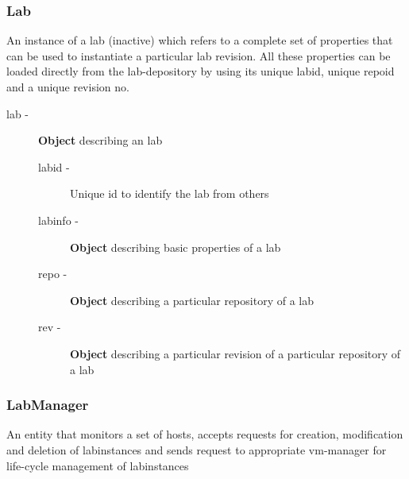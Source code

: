 \documentclass[11pt]{article}
\begin{document}
\subsubsection{Lab}
\label{sec-3.3.2}


    An instance of a lab (inactive)  which refers to a complete set of
    properties that can be used to instantiate a particular lab
    revision. All these properties can be loaded directly from the
    lab-depository by using its unique labid, unique repoid and a
    unique revision no.

\begin{description}
\item [lab -]  \textbf{Object} describing an lab

\begin{description}
\item [labid -] Unique id to identify the lab from others
\item [labinfo -] \textbf{Object} describing basic properties of a lab
\item [repo -] \textbf{Object} describing a particular repository of a lab
\item [rev -] \textbf{Object} describing a particular revision of a particular
             repository of a lab
\end{description}

\end{description}
\subsubsection{LabManager}
\label{sec-3.3.3}


     An entity that monitors a set of hosts, accepts requests for
     creation, modification and deletion of labinstances and sends
     request to appropriate vm-manager for life-cycle management of
     labinstances
\end{document}
